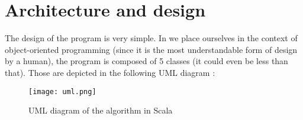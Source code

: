 \section{Architecture and design}
\label{sec:Design}

	The design of the program is very simple. In we place ourselves in the context of object-oriented programming (since it is the most understandable form of design by a human), the program is composed of 5 classes (it could even be less than that). Those are depicted in the following UML diagram :

\begin{figure}[H]
\centering
\texttt{[image: uml.png]}
\caption{UML diagram of the algorithm in Scala}
\label{fig:uml}
\end{figure}